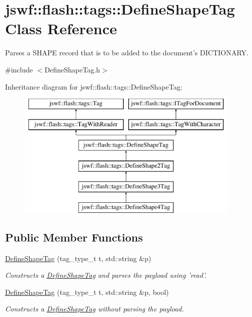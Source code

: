 \hypertarget{classjswf_1_1flash_1_1tags_1_1_define_shape_tag}{\section{jswf\+:\+:flash\+:\+:tags\+:\+:Define\+Shape\+Tag Class Reference}
\label{classjswf_1_1flash_1_1tags_1_1_define_shape_tag}
}


Parses a {\ttfamily S\+H\+A\+P\+E} record that is to be added to the document's {\ttfamily D\+I\+C\+T\+I\+O\+N\+A\+R\+Y}.  




{\ttfamily \#include $<$Define\+Shape\+Tag.\+h$>$}

Inheritance diagram for jswf\+:\+:flash\+:\+:tags\+:\+:Define\+Shape\+Tag\+:\begin{figure}[H]
\begin{center}
\leavevmode
\includegraphics[height=6.000000cm]{classjswf_1_1flash_1_1tags_1_1_define_shape_tag}
\end{center}
\end{figure}
\subsection*{Public Member Functions}
\begin{DoxyCompactItemize}
\item 
\hyperlink{classjswf_1_1flash_1_1tags_1_1_define_shape_tag_af59d9927122094caa75482ef170d6c79}{Define\+Shape\+Tag} (tag\+\_\+type\+\_\+t t, std\+::string \&p)
\begin{DoxyCompactList}\small\item\em Constructs a \hyperlink{classjswf_1_1flash_1_1tags_1_1_define_shape_tag}{Define\+Shape\+Tag} and parses the payload using 'read'. \end{DoxyCompactList}\item 
\hyperlink{classjswf_1_1flash_1_1tags_1_1_define_shape_tag_a5a96b2fdaed05aba74996a16a6dcace1}{Define\+Shape\+Tag} (tag\+\_\+type\+\_\+t t, std\+::string \&p, bool)
\begin{DoxyCompactList}\small\item\em Constructs a \hyperlink{classjswf_1_1flash_1_1tags_1_1_define_shape_tag}{Define\+Shape\+Tag} without parsing the payload. \end{DoxyCompactList}\end{DoxyCompactItemize}
